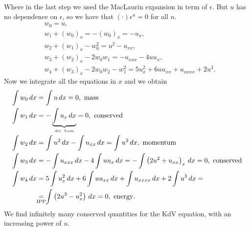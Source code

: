 Where in the last step we used the MacLaurin expansion in term of \(\epsilon\). But \(u\) has no dependence on \(\epsilon\), so we have that \((\cdot)\epsilon^n = 0\) for all \(n\).
\begin{align*}
    &w_0 = u, \\
    &w_1 + (w_0)_x = -(w_0)_x = -u_x, \\
    &w_2 + (w_1)_x - w_0^2 = u^2 - u_{xx}, \\
    &w_3 + (w_2)_x - 2w_0 w_1 = -u_{xxx} - 4uu_x, \\
    &w_4 + (w_3)_x - 2w_0 w_2 - w_1^2 = 5 u_x^2 + 6 u u_{xx} + u_{xxxx} + 2 u^3.   
\end{align*}
Now we integrate all the equations in \(x\) and we obtain 
\begin{align*}
    \int w_0 \, dx &= \int u \, dx = 0, \text{ mass} \\
    \int w_1 \, dx &= -\underbrace{\int u_x \, dx}_{\text{\tiny div. form}} = 0, \text{ conserved} \\
    \int w_2 \, dx &= \int u^2 \, dx - \int u_{xx} \, dx = \int u^2 \, dx, \text{ momentum} \\
    \int w_3 \, dx &= -\int u_{xxx} \, dx - 4 \int u u_x \, dx = - \int \left(2 u^2 + u_{xx}\right)_x \, dx = 0, \text{ conserved} \\
    \int w_4 \, dx &= 5 \int u_x^2 \, dx + 6 \int u u_{xx} \, dx + \int u_{xxxx} \, dx + 2 \int u^3 \, dx = \\
    & \underset{\mathclap{\text{IPP}}}{=} \int \left(2 u^3 - u_x^2\right) \, dx = 0, \text{ energy}.
\end{align*}
We find infinitely many conserved quantities for the KdV equation, with an increasing power of \(u\).

\newpage

